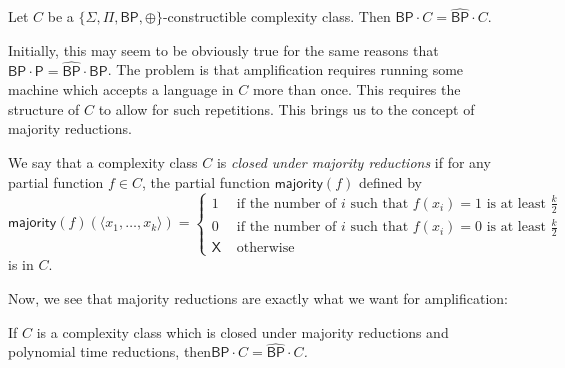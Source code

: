 \documentclass[11pt]{article}
\newcommand{\bp}{\textsf{BP}}
\newcommand{\strongbp}{\widehat{\textsf{BP}}}
\newcommand{\parity}{\oplus}
\newcommand{\p}{\textsf{P}}
\newcommand{\x}{\textsf{X}}
\newcommand{\majority}{\textsf{majority}}
\begin{document}
\begin{theorem}\label{amplify}
Let $C$ be a \emph{$\{\Sigma,\Pi,\bp,\parity\}$}-constructible complexity class. Then \emph{$\bp \cdot C = \strongbp \cdot C$}.
\end{theorem}
Initially, this may seem to be obviously true for the same reasons that $\bp \cdot \p = \strongbp \cdot \bp$. The problem is that amplification requires running some machine which accepts a language in $C$ more than once. This requires the structure of $C$ to allow for such repetitions. This brings us to the concept of majority reductions.
\begin{definition}\label{defmajority}
We say that a complexity class $C$ is \emph{closed under majority reductions} if for any partial function $f \in C$, the partial function $\majority(f)$ defined by
$$\majority(f)(\langle x_1, \ldots, x_k\rangle) = 
\begin{cases}1 & \text{ if the number of $i$ such that }f(x_i) = 1\text{ is at least $\frac{k}{2}$} \\
0 & \text{ if the number of $i$ such that }f(x_i) = 0\text{ is at least $\frac{k}{2}$}\\
\x & \text{ otherwise}
\end{cases}$$
is in $C$.
\end{definition}
Now, we see that majority reductions are exactly what we want for amplification:
\begin{lemma}\label{majorityimpliesamplify}
If $C$ is a complexity class which is closed under majority reductions and polynomial time reductions, then\linebreak \emph{$\bp \cdot C = \strongbp \cdot C$.}
\end{lemma}
\end{document}
